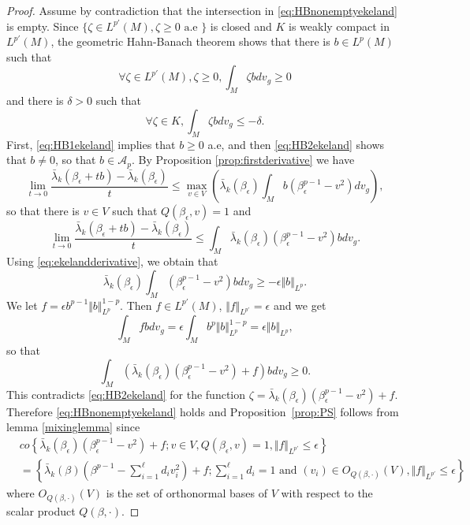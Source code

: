 \documentclass[10pt]{amsart}
\numberwithin{equation}{section}
\def\ep{{\varepsilon}}
\def \ep{\epsilon}
\theoremstyle{plain}
\theoremstyle{remark}
\begin{document}
\begin{proof}
Assume by contradiction that the intersection in \eqref{eq:HBnonemptyekeland} is empty. Since $ \{ \zeta \in L^{p'}(M) , \zeta \geq 0 \text{ a.e } \}$ is closed and $K$ is weakly compact in $L^{p'}(M)$, the geometric Hahn-Banach theorem shows that there is $b \in L^p(M)$ such that
\begin{equation} \label{eq:HB1ekeland} \forall \zeta \in L^{p'}(M), \zeta \geq 0, \int_M \zeta b dv_g \geq 0 \end{equation}
and there is $\delta>0$ such that
\begin{equation} \label{eq:HB2ekeland} \forall \zeta \in  K , \int_M \zeta b dv_g \leq - \delta. \end{equation}
First, \eqref{eq:HB1ekeland} implies that $b \geq 0$ a.e, and then \eqref{eq:HB2ekeland} shows that $b \neq 0$, so that $b \in \mathcal{A}_p$. %
By Proposition \ref{prop:firstderivative} we have %
$$ \lim_{t\to 0} \frac{\bar{\lambda}_k(\beta_\epsilon+tb) - \bar{\lambda}_k(\beta_\epsilon)}{t} \leq \max_{v\in V} \left( \bar{\lambda}_k(\beta_\epsilon)\int_{M} b (\beta_\epsilon^{p-1} - v^2)dv_g \right), $$
so that there is $v \in V$ such that $Q(\beta_\epsilon,v) = 1$ and 
$$ \lim_{t\to 0} \frac{\bar{\lambda}_k(\beta_\epsilon+tb) - \bar{\lambda}_k(\beta_\epsilon)}{t} \leq \int_M \bar{\lambda}_k(\beta_\epsilon)(\beta_\epsilon^{p-1}-v^2)b dv_g.  $$
Using \eqref{eq:ekelandderivative}, we obtain that
$$ \bar{\lambda}_k(\beta_\epsilon) \int_M (\beta_\epsilon^{p-1}-v^2)b dv_g \geq - \epsilon \Vert b \Vert_{L^p}. $$
We let $ f = \ep b^{p-1} \Vert b \Vert_{L^p}^{1-p} $. Then $f\in L^{p'}(M)$, $\Vert f \Vert_{L^{p'}} = \ep $ and we get
$$ \int_M f b dv_g = \ep \int_M b^{p} \Vert b \Vert_{L^p}^{1-p} = \ep \Vert b \Vert_{L^p}, $$
so that
$$ \int_M \left( \bar{\lambda}_k(\beta_\epsilon)(\beta_\epsilon^{p-1}-v^2) + f \right) b dv_g \geq 0. $$
This contradicts \eqref{eq:HB2ekeland} for the function $\zeta = \bar{\lambda}_k(\beta_\epsilon)(\beta_\epsilon^{p-1}-v^2)+f$. Therefore \eqref{eq:HBnonemptyekeland} holds and  
Proposition~\ref{prop:PS} follows from lemma \ref{mixinglemma} since
\begin{equation*} 
\begin{split} & co  \left\{ \bar{\lambda}_k(\beta_{\epsilon}) \left( \beta_{\epsilon}^{p-1} - v^2 \right) + f ; v \in V, Q(\beta_{\epsilon},v) = 1, \Vert f \Vert_{L^{p'}} \leq \epsilon \right\} \\ & = \left\{ \bar{\lambda}_k(\beta) \left( \beta^{p-1} - \sum_{i=1}^\ell d_i v_i^2 \right) + f ; \sum_{i=1}^\ell d_i = 1 \text{ and } (v_i) \in O_{Q(\beta,\cdot)}(V), \Vert f \Vert_{L^{p'}} \leq \epsilon \right\}
\end{split} \end{equation*}
where $O_{Q(\beta,\cdot)}(V)$ is the set of orthonormal bases of $V$ with respect to the scalar product $Q(\beta,\cdot)$.
\end{proof}
\end{document}
